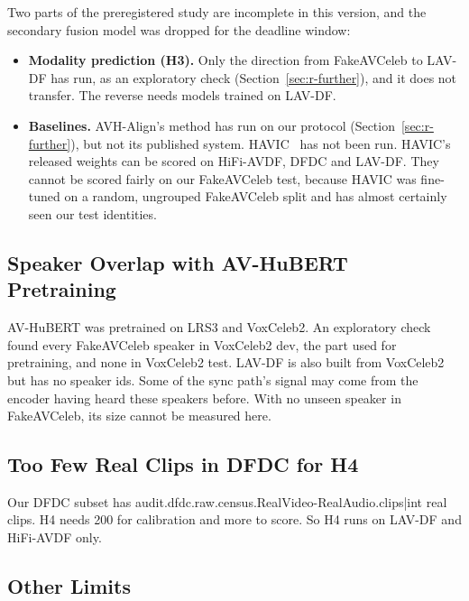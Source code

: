 Two parts of the preregistered study are incomplete in this version, and the
secondary fusion model was dropped for the deadline window:

\begin{itemize}
    \item \textbf{Modality prediction (H3).} Only the direction from
    FakeAVCeleb to LAV-DF has run, as an exploratory check (Section~\ref{sec:r-further}), and it does
    not transfer. The reverse needs models trained on LAV-DF.
    \item \textbf{Baselines.} AVH-Align's method has run on our protocol
    (Section~\ref{sec:r-further}), but not its published system. HAVIC~\cite{havic} has not been
    run. HAVIC's released
    weights can be scored on HiFi-AVDF, DFDC and LAV-DF. They cannot be scored
    fairly on our FakeAVCeleb test, because HAVIC was fine-tuned on a random,
    ungrouped FakeAVCeleb split and has almost certainly seen our test
    identities.
\end{itemize}

\subsection{Speaker Overlap with AV-HuBERT Pretraining}

AV-HuBERT was pretrained on LRS3 and VoxCeleb2. An exploratory check found every
FakeAVCeleb speaker in VoxCeleb2 dev, the part used for pretraining, and none
in VoxCeleb2 test. LAV-DF is also built from VoxCeleb2 but has no speaker ids.
Some of the sync path's signal may come from the encoder having heard these
speakers before. With no unseen speaker in FakeAVCeleb, its size cannot be
measured here.

\subsection{Too Few Real Clips in DFDC for H4}

Our DFDC subset has {{audit.dfdc.raw.census.RealVideo-RealAudio.clips|int}}
real clips. H4 needs 200 for calibration and more to score. So H4 runs on
LAV-DF and HiFi-AVDF only.

\subsection{Other Limits}

